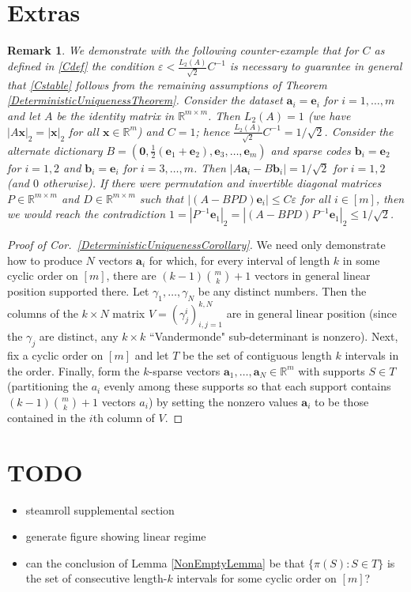 \documentclass[journal, twocolumn]{IEEEtran}
\newtheorem{remark}{Remark}
\begin{document}
\section{Extras}

\begin{remark}
We demonstrate with the following counter-example that for $C$ as defined in \eqref{Cdef} the condition $\varepsilon < \frac{L_2(A)}{\sqrt{2}}C^{-1}$ is necessary to guarantee in general that \eqref{Cstable} follows from the remaining assumptions of Theorem \ref{DeterministicUniquenessTheorem}. Consider the dataset $\mathbf{a}_i = \mathbf{e}_i$ for $i = 1, \ldots, m$ and let $A$ be the identity matrix in $\mathbb{R}^{m \times m}$. Then $L_2(A) = 1$ (we have $|A\mathbf{x}|_2 = |\mathbf{x}|_2$ for all $\mathbf{x} \in \mathbb{R}^m$) and $C = 1$; hence $\frac{L_2(A)}{\sqrt{2}}C^{-1} = 1/\sqrt{2}$. Consider the alternate dictionary $B = \left(\mathbf{0}, \frac{1}{2}(\mathbf{e}_1 + \mathbf{e}_2), \mathbf{e}_3, \ldots, \mathbf{e}_{m} \right)$ and sparse codes $\mathbf{b}_i = \mathbf{e}_2$ for $i = 1, 2$ and $\mathbf{b}_i = \mathbf{e}_i$ for $i = 3, \ldots, m$. Then $|A\mathbf{a}_i - B\mathbf{b}_i| = 1/\sqrt{2}$ for $i = 1, 2$ (and $0$ otherwise). If there were permutation and invertible diagonal matrices $P \in \mathbb{R}^{m \times m}$ and $D \in \mathbb{R}^{m \times m}$ such that $|(A-BPD)\mathbf{e}_i| \leq C\varepsilon$ for all $i \in [m]$, then we would reach the contradiction $1 = |P^{-1}\mathbf{e}_1|_2 = |(A-BPD)P^{-1}\mathbf{e}_1|_2 \leq 1/\sqrt{2}$. 
\end{remark}

\begin{proof}[Proof of Cor.~\ref{DeterministicUniquenessCorollary}]
We need only demonstrate how to produce $N$ vectors $\mathbf{a}_i$ for which, for every interval of length $k$ in some cyclic order on $[m]$, there are  \mbox{$(k-1){m \choose k}+1$} vectors in general linear position supported there. Let $\gamma_1, \ldots, \gamma_N$ be any distinct numbers. Then the columns of the $k \times N$ matrix $V = (\gamma^i_j)^{k,N}_{i,j=1}$ are in general linear position (since the $\gamma_j$ are distinct, any $k \times k$ ``Vandermonde" sub-determinant is nonzero). Next, fix a cyclic order on $[m]$ and let $T$ be the set of contiguous length $k$ intervals in the order. Finally, form the $k$-sparse vectors $\mathbf{a}_1, \ldots, \mathbf{a}_N \in \mathbb{R}^m$ with supports $S \in T$ (partitioning the $a_i$ evenly among these supports so that each support contains $(k-1){m \choose k}+1$ vectors $a_i$) by setting the nonzero values $\mathbf{a}_i$ to be those contained in the $i$th column of $V$.
\end{proof}

\section{TODO}
\begin{itemize}
\item steamroll supplemental section
\item generate figure showing linear regime
\item can the conclusion of Lemma \ref{NonEmptyLemma} be that $\{ \pi(S): S \in T \}$ is the set of consecutive length-$k$ intervals for some cyclic order on $[m]$?
\end{itemize}
\end{document}

